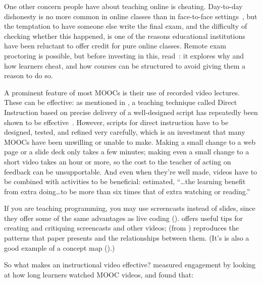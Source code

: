 One other concern people have about teaching online is cheating.
Day-to-day dishonesty is no more common in online classes than in face-to-face settings~\cite{Beck2014},
but the temptation to have someone else write the final exam,
and the difficulty of checking whether this happened,
is one of the reasons educational institutions have been reluctant to offer credit for pure online classes.
Remote exam proctoring is possible,
but before investing in this,
read~\cite{Lang2013}:
it explores why and how learners cheat,
and how courses can be structured to avoid giving them a reason to do so.


A prominent feature of most MOOCs is their use of recorded video lectures.
These can be effective:
as mentioned in ,
a teaching technique called Direct Instruction
based on precise delivery of a well-designed script has repeatedly been shown to be effective~\cite{Stoc2018}.
However,
scripts for direct instruction have to be designed,
tested,
and refined very carefully,
which is an investment that many MOOCs have been unwilling or unable to make.
Making a small change to a web page or a slide deck only takes a few minutes;
making even a small change to a short video takes an hour or more,
so the cost to the teacher of acting on feedback can be unsupportable.
And even when they're well made,
videos have to be combined with activities to be beneficial:
\cite{Koed2015} estimated,
``{\ldots}the learning benefit from extra doing{\ldots}to be
more than six times that of extra watching or reading.''

If you are teaching programming,
you may use screencasts instead of slides,
since they offer some of the same advantages as live coding ().
\cite{Chen2009} offers useful tips for creating and critiquing screencasts and other videos;
 (from \cite{Chen2009}) reproduces the patterns that paper presents
and the relationships between them.
(It's is also a good example of a concept map ().)


So what makes an instructional video effective?
\cite{Guo2014} measured engagement by looking at how long learners watched MOOC videos,
and found that:

